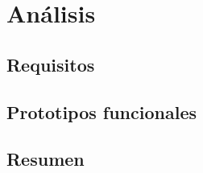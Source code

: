 \chapter{Análisis}

\section{Requisitos}



\section{Prototipos funcionales}




\section{Resumen}

